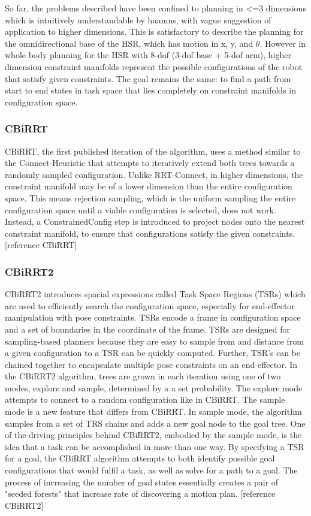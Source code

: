 \documentclass[12pt]{article}
\begin{document}
            \par So far, the problems described have been confined to planning in <=3 dimensions which is intuitively understandable by huamns, with vague suggestion of application to higher dimensions. This is satisfactory to describe the planning for the omnidirectional base of the HSR, which has motion in x, y, and \(\theta\). However in whole body planning for the HSR with 8-dof (3-dof base + 5-dof arm), higher dimension constraint manifolds represent the possible configurations of the robot that satisfy given constraints. The goal remains the same: to find a path from start to end states in task space that lies completely on constraint manifolds in configuration space.

        \subsubsection{CBiRRT} 
            CBiRRT, the first published iteration of the algorithm, uses a method similar to the Connect-Heuristic that attempts to iteratively extend both trees towards a randomly sampled configuration. Unlike RRT-Connect, in higher dimensions, the constraint manifold may be of a lower dimension than the entire configuration space. This means rejection sampling, which is the uniform sampling the entire configuration space until a viable configuration is selected, does not work. Instead, a ConstrainedConfig step is introduced to project nodes onto the nearest constraint manifold, to ensure that configurations satisfy the given constraints. [reference CBiRRT]

        \subsubsection{CBiRRT2} 
            CBiRRT2 introduces spacial expressions called   Task Space Regions (TSRs) which are used to efficiently search the configuration space, especially for end-effector manipulation with pose constraints. TSRs encode a frame in configuration space and a set of boundaries in the coordinate of the frame. TSRs are designed for sampling-based planners because they are easy to sample from and distance from a given configuration to a TSR can be quickly computed. Further, TSR's can be chained together to encapsulate multiple pose constraints on an end effector. In the CBiRRT2 algorithm, trees are grown in each iteration using one of two modes, explore and sample, determined by a a set probability. The explore mode attempts to connect to a random configuration like in CBiRRT. The sample mode is a new feature that differs from CBiRRT. In sample mode, the algorithm samples from a set of TRS chains and adds a new goal node to the goal tree. One of the driving principles behind CBiRRT2, embodied by the sample mode, is the idea that a task can be accomplished in more than one way. By specifying a TSR for a goal, the CBiRRT algorithm attempts to both identify possible goal configurations that would fulfil a task, as well as solve for a path to a goal. The process of increasing the number of goal states essentially creates a pair of "seeded forests" that increase rate of discovering a motion plan. [reference CBiRRT2] 
\end{document}
